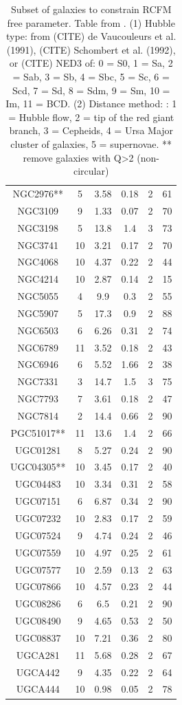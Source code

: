 \documentclass[reprint,%
 amsmath,amssymb,
 aps,
]{revtex4-1}
\begin{document}
\begin{table}[]
\begin{tabular}{|c|c|c|c|c|c|}
NGC2976**& 	5& 	3.58& 	0.18&   	2& 	61\\
NGC3109& 	9& 	1.33& 	0.07&   	2& 	70\\
NGC3198& 	5& 	13.8& 	1.4&    	3& 	73\\
NGC3741& 	10& 	3.21& 	0.17& 	2& 	70\\
NGC4068& 	10& 	4.37& 	0.22& 	2& 	44\\
NGC4214& 	10& 	2.87& 	0.14& 	2& 	15\\
NGC5055& 	4& 	9.9& 	0.3&    	2& 	55\\
NGC5907& 	5& 	17.3& 	0.9&    	2& 	88\\
NGC6503& 	6& 	6.26& 	0.31&   	2& 	74\\
NGC6789& 	11& 	3.52& 	0.18& 	2& 	43\\
NGC6946& 	6& 	5.52& 	1.66&   	2& 	38\\
NGC7331& 	3& 	14.7& 	1.5&    	3& 	75\\
NGC7793& 	7& 	3.61& 	0.18&   	2& 	47\\
NGC7814& 	2&  	14.4& 	0.66& 	2& 	90\\
PGC51017**& 	11& 	13.6& 	1.4& 	2& 	66\\
UGC01281& 	8&   	5.27& 	0.24& 	2& 	90\\
UGC04305**& 	10& 	3.45& 	0.17& 	2& 	40\\
UGC04483& 	10& 	3.34& 	0.31& 	2& 	58\\
UGC07151& 	6& 	6.87& 	0.34&   	2& 	90\\
UGC07232& 	10& 	2.83& 	0.17& 	2& 	59\\
UGC07524& 	9& 	4.74& 	0.24& 	    2& 	46\\
UGC07559& 	10& 	4.97& 	0.25& 	2& 	61\\
UGC07577& 	10& 	2.59& 	0.13& 	2& 	63\\
UGC07866& 	10& 	4.57& 	0.23& 	2& 	44\\
UGC08286& 	6& 	6.5& 	0.21&   	2& 	90\\
UGC08490& 	9& 	4.65& 	0.53&   	2& 	50\\
UGC08837& 	10& 	7.21& 	0.36& 	2& 	80\\
UGCA281& 	11& 	5.68& 	0.28& 	2& 	67\\
UGCA442& 	9& 	4.35& 	0.22& 	    2& 	64\\
UGCA444& 	10& 	0.98& 	0.05& 	2& 	78\\
    \hline \hline           
      \end{tabular}
      \caption{Subset of galaxies to constrain RCFM free parameter.  Table from  \citet{2016Lelli}. 
      (1) Hubble type:  from (CITE) de
Vaucouleurs et al. (1991), (CITE) Schombert et al. (1992), or (CITE) NED3
of: 0 = S0, 1 = Sa, 2 = Sab,
3 = Sb, 4 = Sbc, 5 = Sc, 6 = Scd, 7 = Sd, 8 = Sdm,
9 = Sm, 10 = Im, 11 = BCD.  (2) Distance method: : 1 = Hubble flow,
2 = tip of the red giant branch, 3 = Cepheids, 4 = Ursa Major
cluster of galaxies, 5 = supernovae. ** remove galaxies with Q>2 (non-circular)}
   \label{tab:Tset}
  \end{table}
  
\end{document}
